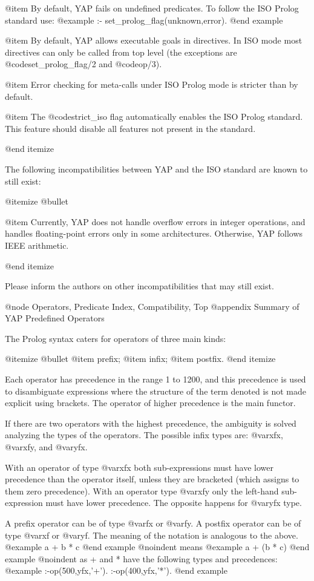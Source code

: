 {{{{{{{{@item By default, YAP fails on undefined predicates. To follow the ISO
Prolog standard use:
@example
:- set_prolog_flag(unknown,error).
@end example

@item By default, YAP allows executable goals in directives. In ISO mode
most directives can only be called from top level (the exceptions are
@code{set_prolog_flag/2} and @code{op/3}).

@item Error checking for meta-calls under ISO Prolog mode is stricter
than by default.

@item The @code{strict_iso} flag automatically enables the ISO Prolog
standard. This feature should disable all features not present in the
standard.

@end itemize

The following incompatibilities between YAP and the ISO standard are
known to still exist:

@itemize @bullet

@item Currently, YAP does not handle overflow errors in integer
operations, and handles floating-point errors only in some
architectures. Otherwise, YAP follows IEEE arithmetic.

@end itemize

Please inform the authors on other incompatibilities that may still
exist.

@node Operators, Predicate Index, Compatibility, Top
@appendix Summary of YAP Predefined Operators


 The Prolog syntax caters for operators of three main kinds:

@itemize @bullet
@item
prefix;
@item
infix;
@item
postfix.
@end itemize

 Each operator has precedence in the range 1 to 1200, and this 
precedence is used to disambiguate expressions where the structure of the 
term denoted is not made explicit using brackets. The operator of higher 
precedence is the main functor.

 If there are two operators with the highest precedence, the ambiguity 
is solved analyzing the types of the operators. The possible infix types are: 
@var{xfx}, @var{xfy}, and @var{yfx}.

 With an operator of type @var{xfx} both sub-expressions must have lower 
precedence than the operator itself, unless they are bracketed (which 
assigns to them zero precedence). With an operator type @var{xfy} only the  
left-hand sub-expression must have lower precedence. The opposite happens 
for @var{yfx} type.

 A prefix operator can be of type @var{fx} or @var{fy}. 
A postfix operator can be of type @var{xf} or @var{yf}. 
The meaning of the notation is analogous to the above.
@example
a + b * c
@end example
@noindent
means
@example
a + (b * c)
@end example
@noindent
as + and * have the following types and precedences:
@example
:-op(500,yfx,'+').
:-op(400,yfx,'*').
@end example

}}}}}}}}
